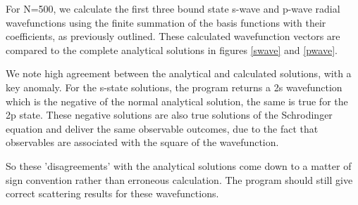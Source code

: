 \documentclass{article}
\begin{document}
	For N=500, we calculate the first three bound state s-wave and p-wave radial wavefunctions using the finite summation of the basis functions with their coefficients, as previously outlined. These calculated wavefunction vectors are compared to the complete analytical solutions in figures \ref{swave} and \ref{pwave}. 
	
	We note high agreement between the analytical and calculated solutions, with a key anomaly. For the s-state solutions, the program returns a 2s wavefunction which is the negative of the normal analytical solution, the same is true for the 2p state. These negative solutions are also true solutions of the Schrodinger equation and deliver the same observable outcomes, due to the fact that observables are associated with the square of the wavefunction. 
	
	So these 'disagreements' with the analytical solutions come down to a matter of sign convention rather than erroneous calculation. The program should still give correct scattering results for these wavefunctions.
	
\end{document}
